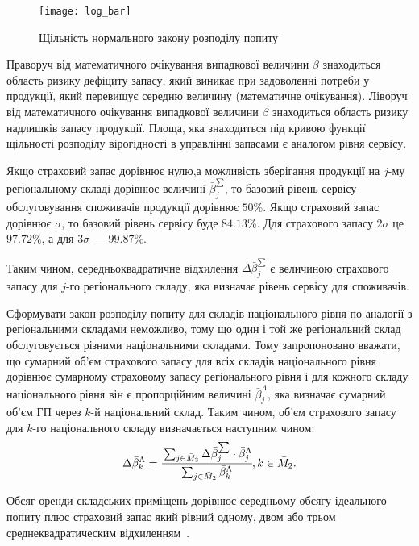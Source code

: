 \begin{figure}[H]
	\centering
	\texttt{[image: log\_bar]}
	\caption{Щільність нормального закону розподілу попиту}
	\label{fig:log_bar}
\end{figure}

Праворуч від математичного очікування випадкової величини $\beta$ знаходиться область ризику дефіциту запасу, який виникає при задоволенні потреби у продукції, який перевищує середню величину (математичне очікування).
Ліворуч від математичного очікування випадкової величини $\beta$ знаходиться область ризику надлишків запасу продукції.
Площа, яка знаходиться під кривою функції щільності розподілу вірогідності в управлінні запасами є аналогом рівня сервісу.

Якщо страховий запас дорівнює нулю,а можливість зберігання продукції на $j$-му регіональному складі дорівнює величині $\bar{\beta}_j^{\sum}$, то базовий рівень сервісу обслуговування споживачів продукції дорівнює $50$\%. Якщо страховий запас дорівнює $\sigma$, то базовий рівень сервісу буде $84.13$\%. Для страхового запасу $2\sigma$ це $97.72$\%, а для $3\sigma$ --- $99.87$\%.

Таким чином, середньоквадратичне відхилення $\Delta\bar{\beta}_j^{\sum}$ є величиною страхового запасу для $j$-го регіонального складу, яка визначає рівень сервісу для споживачів.

Сформувати закон розподілу попиту для складів національного рівня по аналогії з регіональними складами неможливо, тому що один і той же регіональний склад обслуговується різними національними складами.
Тому запропоновано вважати, що сумарний об’єм страхового запасу для всіх складів національного рівня дорівнює сумарному страховому запасу регіонального рівня і для кожного складу національного рівня він є пропорційним величині $\bar{\beta}_j^{\Lambda}$, яка визначає сумарний об’єм ГП через $k$-й національний склад. Таким чином, об’єм страхового запасу для $k$-го національного складу визначається наступним чином:
\begin{equation} \label{eq:b_1}
	\Delta \bar{\beta}_k^{\Lambda} = \cfrac{\sum_{j \in \bar{M}_3} \Delta \bar{\beta}_j^{\sum} \cdot \bar{\beta}_j^{\Lambda} }{\sum_{j \in \bar{M}_2} \bar{\beta}^\Lambda_k }, k \in \bar{M}_2.
\end{equation}

Обсяг оренди складських приміщень дорівнює середньому обсягу ідеального попиту плюс страховий запас який рівний одному, двом або трьом среднеквадратическим відхиленням~\cite{Stankevich}.

